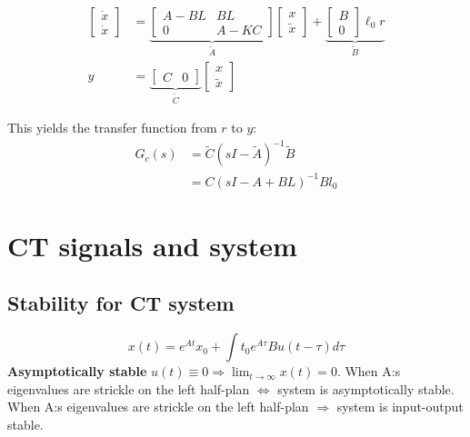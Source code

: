 \begin{multicols}{2}
\begin{equation*}
\begin{aligned}
    {\left[\begin{array}{c}
    \dot{x} \\
    \dot{x}
    \end{array}\right] } & =\underbrace{\left[\begin{array}{cc}
    A-B L & B L \\
    0 & A-K C
    \end{array}\right]}_{\tilde{A}}\left[\begin{array}{l}
    x \\
    \tilde{x}
    \end{array}\right]+\underbrace{\left[\begin{array}{c}
    B \\
    0
    \end{array}\right] \ell_0 r}_{\widetilde{B}} \\
    y & =\underbrace{\left[\begin{array}{ll}
    C & 0
    \end{array}\right]}_{\widetilde{C}}\left[\begin{array}{l}
    x \\
    \tilde{x}
    \end{array}\right]
\end{aligned}
\end{equation*}

This yields the transfer function from $r$ to $y$:
\begin{align*}
    G_c(s) &= \widetilde{C}(sI-\widetilde{A})^{-1}\widetilde{B} \\
    &= C(sI-A+BL)^{-1}Bl_0
\end{align*}


\section{CT signals and system}
\subsection{Stability for CT system}
\begin{equation*}
    x(t) = e^{At}x_0 + \int{t}_{0} e^{A\tau}Bu(t-\tau)d\tau
\end{equation*}
\textbf{Asymptotically stable} $u(t)\equiv0 \Rightarrow \lim_{t\to\infty}x(t) = 0$.
When A:s eigenvalues are strickle on the left half-plan $\Leftrightarrow$ system is asymptotically stable.
When A:s eigenvalues are strickle on the left half-plan $\Rightarrow$ system is input-output stable.


\end{multicols}
